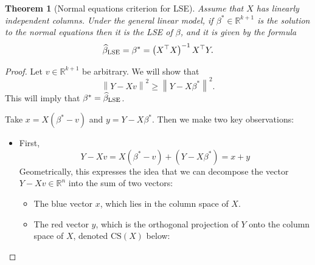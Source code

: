 \documentclass[10pt]{article}
\newtheorem{theorem}{Theorem}
\theoremstyle{definition}
\newcommand{\norm}[1]{\left\lVert#1\right\rVert} %
\newcommand{\1}[1]{\textbf{1}_{\left[#1\right]}} %
\def\R{\mathbb{R}} %
\begin{document}
\begin{theorem}[Normal equations criterion for LSE]
  \label{thm:normal-equations-criterion-lse}
  Assume that $X$ has linearly independent columns. Under the general linear
  model, if $\beta^{*}\in \R^{k+1}$ is the solution to the normal equations
  then it is the LSE of $\beta$, and it is given by the formula
  \begin{equation}\label{eq:normal-equations-criterion}
    \widehat{\beta}_{\rm LSE} = \beta^{*}=\left( X^{\top} X \right)^{-1} X^{\top} Y. 
  \end{equation}
\end{theorem}
\begin{proof}
  Let $v\in \R^{k+1}$ be arbitrary. We will show that
  \begin{equation}\label{eq:33}
    \norm{Y-Xv}^{2}\geq \norm{Y-X\beta^{*}}^{2}.
  \end{equation}
  This will imply that $\beta^{*} = \widehat{\beta}_{\rm LSE}$.
 
  Take $x=X(\beta^{*}-v)$ and $y= Y-X\beta^{*}$. Then we make two key
  observations:
  \begin{itemize}
    \item First,
    \begin{equation*}
      Y-Xv = X(\beta^{*}-v) + (Y-X\beta^{*}) = x+y
    \end{equation*}
    Geometrically, this expresses the idea that we can decompose the vector
    $Y-Xv\in \R^{n}$ into the sum of two vectors:
    \begin{itemize}
      \item The blue vector $x$, which lies in the column space of $X$.
      \item The red vector $y$, which is the orthogonal projection of $Y$ onto
      the column space of $X$, denoted $\mathrm{CS}(X)$ below:
    \end{itemize}

    \begin{center}
\end{center}
\end{itemize}
\end{proof}
\end{document}

